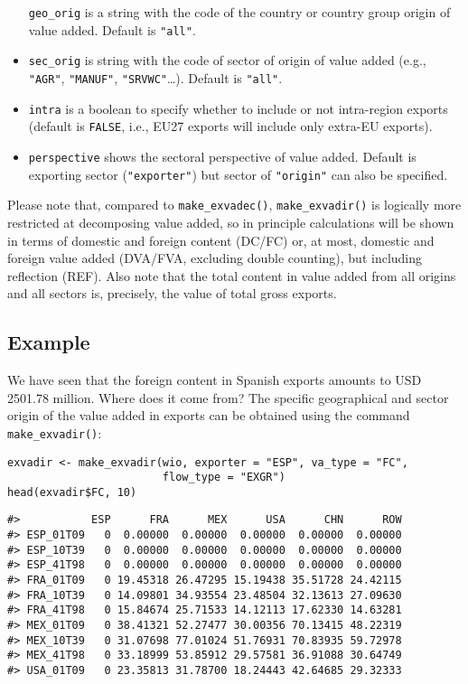 \begin{itemize}
  \texttt{geo\_orig} is a string with the code of the country or country group origin
  of value added. Default is \texttt{"all"}.
\item
  \texttt{sec\_orig} is string with the code of sector of origin of value added (e.g.,
  \texttt{"AGR"}, \texttt{"MANUF"}, \texttt{"SRVWC"}\ldots). Default is \texttt{"all"}.
\item
  \texttt{intra} is a boolean to specify whether to include or not intra-region
  exports (default is \texttt{FALSE}, i.e., EU27 exports will include only extra-EU
  exports).
\item
  \texttt{perspective} shows the sectoral perspective of value added. Default is
  exporting sector (\texttt{"exporter"}) but sector of \texttt{"origin"} can also be
  specified.
\end{itemize}

Please note that, compared to \texttt{make\_exvadec()}, \texttt{make\_exvadir()} is logically
more restricted at decomposing value added, so in principle calculations will
be shown in terms of domestic and foreign content (DC/FC) or, at most, domestic
and foreign value added (DVA/FVA, excluding double counting), but including
reflection (REF). Also note that the total content in value added from all
origins and all sectors is, precisely, the value of total gross exports.

\hypertarget{example}{%
\subsection{Example}\label{example}}

We have seen that the foreign content in Spanish exports amounts to USD 2501.78
million. Where does it come from? The specific geographical and sector origin of
the value added in exports can be obtained using the command \texttt{make\_exvadir()}:

\begin{verbatim}
exvadir <- make_exvadir(wio, exporter = "ESP", va_type = "FC", 
                        flow_type = "EXGR")
head(exvadir$FC, 10)
\end{verbatim}

\begin{verbatim}
#>           ESP      FRA      MEX      USA      CHN      ROW
#> ESP_01T09   0  0.00000  0.00000  0.00000  0.00000  0.00000
#> ESP_10T39   0  0.00000  0.00000  0.00000  0.00000  0.00000
#> ESP_41T98   0  0.00000  0.00000  0.00000  0.00000  0.00000
#> FRA_01T09   0 19.45318 26.47295 15.19438 35.51728 24.42115
#> FRA_10T39   0 14.09801 34.93554 23.48504 32.13613 27.09630
#> FRA_41T98   0 15.84674 25.71533 14.12113 17.62330 14.63281
#> MEX_01T09   0 38.41321 52.27477 30.00356 70.13415 48.22319
#> MEX_10T39   0 31.07698 77.01024 51.76931 70.83935 59.72978
#> MEX_41T98   0 33.18999 53.85912 29.57581 36.91088 30.64749
#> USA_01T09   0 23.35813 31.78700 18.24443 42.64685 29.32333
\end{verbatim}

